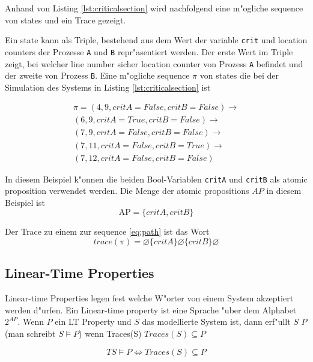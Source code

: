 \documentclass[11pt,twoside,a4paper]{article}
\begin{document}
Anhand von Listing \ref{lst:criticalsection} wird nachfolgend eine m"ogliche sequence von states und ein Trace gezeigt.



Ein state kann als Triple, bestehend aus dem Wert der variable \verb|crit| und location counters der Prozesse \verb|A| und \verb|B| repr"asentiert werden. Der erste Wert im Triple zeigt, bei welcher line number sicher location counter von Prozess \verb|A| befindet und der zweite von Prozess \verb|B|.
Eine m"ogliche sequence $\pi$ von states die bei der Simulation des Systems in Listing \ref{lst:criticalsection} ist

\begin{equation}
  \label{eq:path}
  \begin{split}
\pi = (4, 9, {critA}={False},{critB}=False) \rightarrow \\
(6, 9, {critA}={True},{critB}=False) \rightarrow \\
(7, 9, {critA}={False},{critB}=False) \rightarrow \\
(7, 11, {critA}={False},{critB}=True) \rightarrow \\
(7, 12, {critA}={False},{critB}=False)
  \end{split}
\end{equation}

In diesem Beispiel k"onnen die beiden Bool-Variablen \verb|critA| und \verb|critB| als atomic proposition verwendet werden. Die Menge der atomic propositions $AP$ in diesem Beispiel ist
\[
\text{AP}=\{critA, critB\}
\]

Der Trace zu einem zur sequence \ref{eq:path} ist das Wort
\[
trace(\pi) = \varnothing \{critA\} \varnothing \{critB\} \varnothing
\]

\subsection{Linear-Time Properties}
\label{sec:satisfactionrelations}

Linear-time Properties legen fest welche W"orter von einem System akzeptiert werden d"urfen. Ein Linear-time property ist eine Sprache "uber dem Alphabet $2^{AP}$.
Wenn $P$ ein LT Property und $S$ das modellierte System ist, dann erf"ullt $S$ $P$ (man schreibt $S \models P$) wenn Traces(S) $ Traces(S) \subseteq P $

\[
TS \models P \iff Traces(S) \subseteq P 
\]
\end{document}
